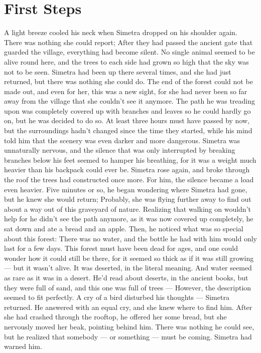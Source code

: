 \chapter{First Steps}
\label{cha:first-steps}
A light breeze cooled his neck when Simetra dropped on his shoulder again. There was nothing she could report; After they had passed the ancient gate that guarded the village, everything had become silent. No single animal seemed to be alive round here, and the trees to each side had grown so high that the sky was not to be seen. 
Simetra had been up there several times, and she had just returned, but there was nothing she could do. The end of the forest could not be made out, and even for her, this was a new sight, for she had never been so far away from the village that she couldn't see it anymore. 
The path he was treading upon was completely covered up with branches and leaves so he could hardly go on, but he was decided to do so. At least three hours must have passed by now, but the surroundings hadn't changed since the time they started, while his mind told him that the scenery was even darker and more dangerous. Simetra was unnaturally nervous, and the silence that was only interrupted by breaking branches below his feet seemed to hamper his breathing, for it was a weight much heavier than his backpack could ever be. 
Simetra rose again, and broke through the roof the trees had constructed once more. For him, the silence became a load even heavier. 
Five minutes or so, he began wondering where Simetra had gone, but he knew she would return; Probably, she was flying further away to find out about a way out of this graveyard of nature. Realizing that walking on wouldn't help for he didn't see the path anymore, as it was now covered up completely, he sat down and ate a bread and an apple. Then, he noticed what was so special about this forest: There was no water, and the bottle he had with him would only last for a few days. This forest must have been dead for ages, and one could wonder how it could still be there, for it seemed so thick as if it was still growing --- but it wasn't alive. 
It was deserted, in the literal meaning. 
And water seemed as rare as it was in a desert. He'd read about deserts, in the ancient books, but they were full of sand, and this one was full of trees --- However, the description seemed to fit perfectly. 
A cry of a bird disturbed his thoughts --- Simetra returned. He answered with an equal cry, and she knew where to find him. After she had crashed through the rooftop, he offered her some bread, but she nervously moved her beak, pointing behind him. There was nothing he could see, but he realized that somebody --- or something --- must be coming. Simetra had warned him. 
